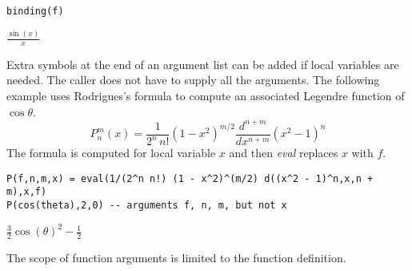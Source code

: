 \begin{Verbatim}[formatcom=\color{blue}]
binding(f)
\end{Verbatim}

\noindent
$\displaystyle \frac{\sin(x)}{x}$

\bigskip
\noindent
Extra symbols at the end of an argument list can be added if local variables are needed.
The caller does not have to supply all the arguments.
The following example uses Rodrigues's formula to
compute an associated Legendre function of $\cos\theta$.
\begin{equation*}
P_n^m(x)=\frac{1}{2^n\,n!}(1-x^2)^{m/2}\frac{d^{n+m}}{dx^{n+m}}(x^2-1)^n
\end{equation*}
The formula is computed for local variable $x$ and then
{\it eval} replaces $x$ with $f$.

\begin{Verbatim}[formatcom=\color{blue}]
P(f,n,m,x) = eval(1/(2^n n!) (1 - x^2)^(m/2) d((x^2 - 1)^n,x,n + m),x,f)
P(cos(theta),2,0) -- arguments f, n, m, but not x
\end{Verbatim}

\noindent
$\displaystyle \tfrac{3}{2} \cos(\theta)^2-\tfrac{1}{2}$

\bigskip
\noindent
The scope of function arguments is limited to the function definition.
